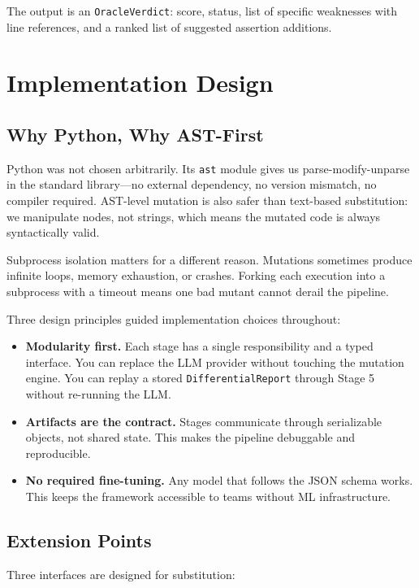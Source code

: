 \documentclass[conference]{IEEEtran}
\begin{document}
The output is an \texttt{OracleVerdict}: score, status, list of specific weaknesses with line references, and a ranked list of suggested assertion additions.

\section{Implementation Design}

\subsection{Why Python, Why AST-First}

Python was not chosen arbitrarily. Its \texttt{ast} module gives us parse-modify-unparse in the standard library—no external dependency, no version mismatch, no compiler required. AST-level mutation is also safer than text-based substitution: we manipulate nodes, not strings, which means the mutated code is always syntactically valid.

Subprocess isolation matters for a different reason. Mutations sometimes produce infinite loops, memory exhaustion, or crashes. Forking each execution into a subprocess with a timeout means one bad mutant cannot derail the pipeline.

Three design principles guided implementation choices throughout:

\begin{itemize}
\item \textbf{Modularity first.} Each stage has a single responsibility and a typed interface. You can replace the LLM provider without touching the mutation engine. You can replay a stored \texttt{DifferentialReport} through Stage 5 without re-running the LLM.
\item \textbf{Artifacts are the contract.} Stages communicate through serializable objects, not shared state. This makes the pipeline debuggable and reproducible.
\item \textbf{No required fine-tuning.} Any model that follows the JSON schema works. This keeps the framework accessible to teams without ML infrastructure.
\end{itemize}

\subsection{Extension Points}

Three interfaces are designed for substitution:
\end{document}
